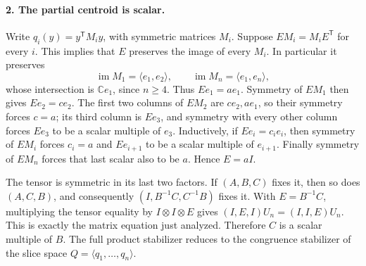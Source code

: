 \paragraph{2. The partial centroid is scalar.}
Write $q_i(y)=y^{\mathsf T}M_i y$, with symmetric matrices $M_i$.
Suppose $E M_i=M_iE^{\mathsf T}$ for every $i$.  This implies that
$E$ preserves the image of every $M_i$.  In particular it preserves
\[
 \operatorname{im}M_1=\langle e_1,e_2\rangle,
 \qquad \operatorname{im}M_n=\langle e_1,e_n\rangle,
\]
whose intersection is $\mathbb C e_1$, since $n\ge4$.
Thus $Ee_1=a e_1$.  Symmetry of $EM_1$ then gives $Ee_2=c e_2$.
The first two columns of $EM_2$ are $c e_2,a e_1$, so their
symmetry forces $c=a$; its third column is $Ee_3$, and symmetry
with every other column forces $Ee_3$ to be a scalar multiple of
$e_3$.  Inductively, if $Ee_i=c_i e_i$, then symmetry of $EM_i$
forces $c_i=a$ and $Ee_{i+1}$ to be a scalar multiple of $e_{i+1}$.
Finally symmetry of $EM_n$ forces that last scalar also to be $a$.
Hence $E=aI$.

The tensor is symmetric in its last two factors.  If $(A,B,C)$ fixes
it, then so does $(A,C,B)$, and consequently
$(I,B^{-1}C,C^{-1}B)$ fixes it.  With $E=B^{-1}C$, multiplying the
tensor equality by $I\otimes I\otimes E$ gives
$(I,E,I)U_n=(I,I,E)U_n$.  This is exactly the matrix equation just
analyzed.  Therefore $C$ is a scalar multiple of $B$.
The full product stabilizer reduces to the congruence stabilizer of
the slice space $Q=\langle q_1,\ldots,q_n\rangle$.

